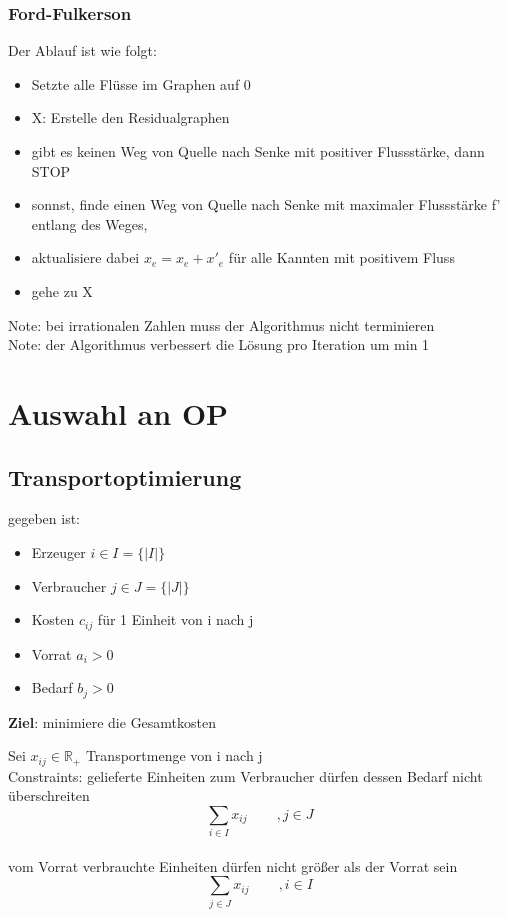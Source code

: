 \documentclass[12pt,a4paper, hyperref]{article}
\begin{document}
\subsubsection{Ford-Fulkerson}
Der Ablauf ist wie folgt:
\begin{itemize}
\item Setzte alle Flüsse im Graphen auf 0
\item X: Erstelle den Residualgraphen
\item gibt es keinen Weg von Quelle nach Senke mit positiver Flussstärke, dann STOP
\item sonnst, finde einen Weg von Quelle nach Senke mit maximaler Flussstärke f' entlang des Weges, 
\item aktualisiere dabei $x_e = x_e + x'_e$ für alle Kannten mit positivem Fluss
\item gehe zu X
\end{itemize}
Note: bei irrationalen Zahlen muss der Algorithmus nicht terminieren\\
Note: der Algorithmus verbessert die Lösung pro Iteration um min 1

\section{Auswahl an OP}

\subsection{Transportoptimierung}
gegeben ist:
\begin{itemize}
\item Erzeuger $i \in I = \{|I|\}$
\item Verbraucher $j \in J = \{|J|\}$
\item Kosten $c_{ij}$ für 1 Einheit von i nach j
\item Vorrat $a_i > 0$
\item Bedarf $b_j > 0$
\end{itemize}
\textbf{Ziel}: minimiere die Gesamtkosten

Sei  $x_{ij} \in \mathbb{R}_+$ Transportmenge von i nach j\\

\flushleft Constraints:
\flushleft gelieferte Einheiten zum Verbraucher dürfen dessen Bedarf nicht überschreiten
\[ \sum_{i\in I} x_{ij}\hspace{25pt} , j \in J  \]\\

\flushleft vom Vorrat verbrauchte Einheiten dürfen nicht größer als der Vorrat sein
\[ \sum_{j\in J} x_{ij}\hspace{25pt} , i \in I   \]\\
\end{document}
